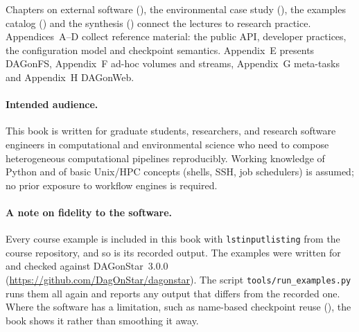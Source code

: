 Chapters on external software (), the
environmental case study (), the examples catalog
() and the synthesis () connect
the lectures to research practice. Appendices~A--D collect reference
material: the public API, developer practices, the configuration model and
checkpoint semantics. Appendix~E presents DAGonFS, Appendix~F ad-hoc volumes
and streams, Appendix~G meta-tasks and Appendix~H DAGonWeb.

\paragraph{Intended audience.}
This book is written for graduate students, researchers, and research software
engineers in computational and environmental science who need to compose
heterogeneous computational pipelines reproducibly. Working knowledge of
Python and of basic Unix/HPC concepts (shells, SSH, job schedulers) is
assumed; no prior exposure to workflow engines is required.

\paragraph{A note on fidelity to the software.}
Every course example is included in this book with \texttt{lstinputlisting}
from the course repository, and so is its recorded output. The examples were
written for and checked against DAGonStar~3.0.0
(\url{https://github.com/DagOnStar/dagonstar}). The script
\texttt{tools/run\_examples.py} runs them all again and reports any output
that differs from the recorded one. Where the software has a limitation,
such as name-based checkpoint reuse (), the book shows it
rather than smoothing it away.
